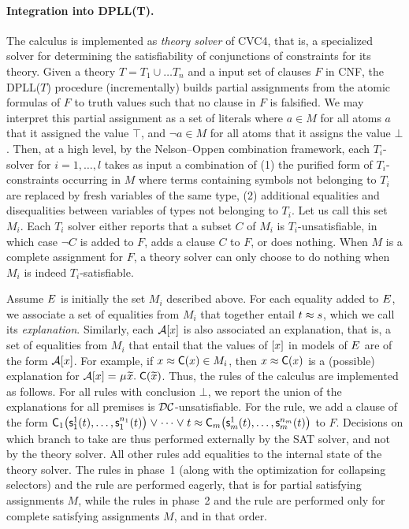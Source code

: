 \paragraph{Integration into DPLL(T).}
The calculus is implemented as \emph{theory solver} of CVC4,
that is, a specialized solver for determining the satisfiability of conjunctions of constraints for its theory.
Given a theory $T = T_1 \mathrel\cup \ldots T_n$ and a input set of clauses $F$ in CNF,
the DPLL($T$)  procedure
(incrementally) builds partial assignments from the atomic formulas of $F$ to truth values such that no clause in $F$ is falsified.
We may interpret this partial assignment as a set of literals where $a \in M$ for all atoms $a$ that it assigned the value $\top$, and $\neg a \in M$ for all atoms that it assigns the value $\bot$.
Then, at a high level, by the Nelson--Oppen combination framework,
each $T_i$-solver for $i = 1, \ldots, l$ takes as input a combination of (1) the purified form of $T_i$-constraints occurring in $M$ where terms containing symbols not belonging to $T_i$ are replaced by fresh variables of the same type,
(2) additional equalities and disequalities between variables of types not belonging to $T_i$.
Let us call this set $M_i$.
Each $T_i$ solver either
reports that a subset $C$ of $M_i$ is $T_i$-unsatisfiable, in which case $\neg C$ is added to $F$,
adds a clause $C$ to $F$,
or does nothing.
When $M$ is a complete assignment for $F$, a theory solver can only choose to do nothing when $M_i$ is indeed $T_i$-satisfiable.

Assume $E$ is initially the set $M_i$ described above.
For each equality added to $E$, we associate a set of equalities from $M_i$ that together entail $t \approx s$,
which we call its \emph{explanation}.
Similarly, each $\mathcal{A} [x]$ is also associated an explanation, that is,
a set of equalities from $M_i$ that entail that the values of $[x]$ in models of $E$ are of the form $\mathcal{A} [x]$.
For example, if $x \approx \textsf{C}( x ) \in M_i$, then $x \approx \textsf{C}( x )$ is a (possible) explanation for $\Val \ec{x} = \MU {\Varec{x}}.\; \const{C}( {\Varec{x}} )$.
Thus, the rules of the calculus are implemented as follows.
For all rules with conclusion $\bot$,
we report the union of the explanations for all premises is $\mathcal{DC}$-unsatisfiable.
For the  rule, we add a clause of the form
$\textsf{C}_1\bigl( \textsf{s}^1_1( t ), \ldots, \textsf{s}^{n_1}_1( t ) \bigr) \mathrel\lor \cdots \mathrel\lor t \approx \textsf{C}_m\bigl( \textsf{s}^1_m( t ), \ldots, \textsf{s}^{n_m}_m( t ) \bigr)$
to $F$.
Decisions on which branch to take are thus performed externally by the SAT solver, and not by the theory solver.
All other rules add equalities to the internal state of the theory solver.
The rules in phase~1 (along with the optimization for collapsing selectors) and the  rule are performed eagerly,
that is for partial satisfying assignments $M$, while the rules in phase~2 and the  rule are performed only for complete satisfying assignments $M$,
and in that order.

